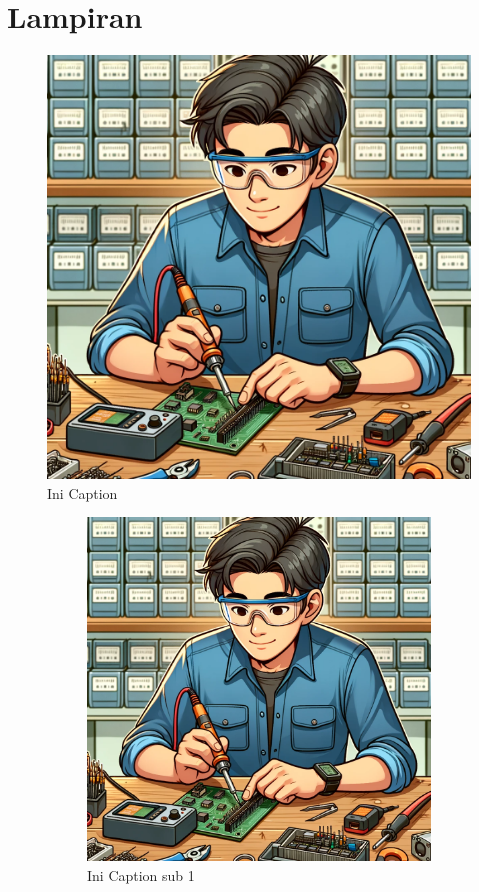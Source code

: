 \section*{Lampiran} %
\begin{figure}[H]
  \centering
  \includegraphics[width=0.2\linewidth]{img/contohgambar.png}
  \caption{Ini Caption} 
  \label{fig:inirujukan}
\end{figure}
\vspace{0pt}
\begin{figure}[H]
  \centering
  \begin{subfigure}[b]{0.4\linewidth}
    \centering
    \includegraphics[width=\linewidth]{img/contohgambar.png}
    \caption{Ini Caption sub 1\label{fig:inisub1}}
  \end{subfigure}
  \hspace{1cm}
  \begin{subfigure}[b]{0.4\linewidth}
    \centering

\end{subfigure}
\end{figure}
